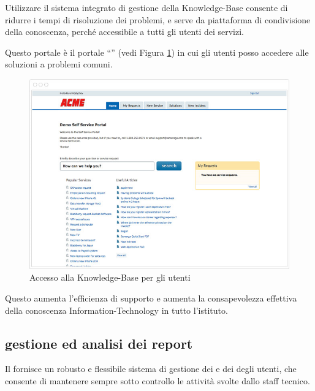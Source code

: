 Utilizzare il sistema integrato di gestione della \ac{Knowledge-Base} consente di ridurre i tempi di risoluzione dei problemi, e serve da piattaforma di condivisione della conoscenza, perché accessibile a tutti gli utenti dei servizi. 

Questo portale è il portale ``'' (vedi Figura \ref{sd-tools-knowledge-base-img-2}) in cui gli utenti posso accedere alle soluzioni a problemi comuni.

\begin{figure}[htbp]
\centering
\includegraphics[scale=0.6]{Images/samanage/Knowledge_base_self_service.png}
\caption{Accesso alla \ac{Knowledge-Base} per gli utenti}
\label{sd-tools-knowledge-base-img-2}
\end{figure}

Questo aumenta l'efficienza di supporto e aumenta la consapevolezza effettiva della conoscenza \acs{Information-Technology} in tutto l'istituto.

\subsection[Gestione ed analisi dei report]{gestione ed analisi dei report}
\label{sd-tools-report}
Il  fornisce un robusto e flessibile sistema di gestione dei  e dei  degli utenti, che consente di mantenere sempre sotto controllo le attività svolte dallo staff tecnico.

